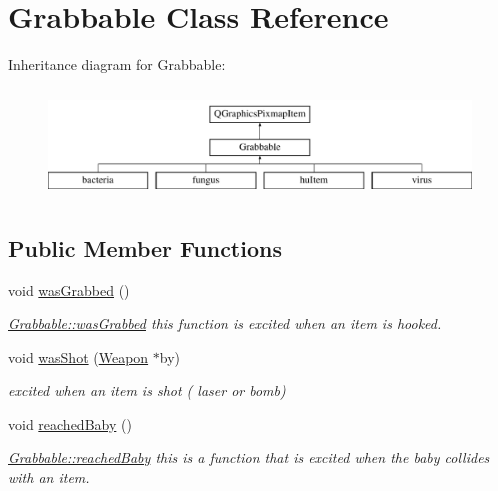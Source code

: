 \hypertarget{classGrabbable}{\section{Grabbable Class Reference}
\label{classGrabbable}
}
Inheritance diagram for Grabbable\-:\begin{figure}[H]
\begin{center}
\leavevmode
\includegraphics[height=2.937063cm]{classGrabbable}
\end{center}
\end{figure}
\subsection*{Public Member Functions}
\begin{DoxyCompactItemize}
\item 
void \hyperlink{classGrabbable_a54abafe482bfeff9bc4950eb1af86729}{was\-Grabbed} ()
\begin{DoxyCompactList}\small\item\em \hyperlink{classGrabbable_a54abafe482bfeff9bc4950eb1af86729}{Grabbable\-::was\-Grabbed} this function is excited when an item is hooked. \end{DoxyCompactList}\item 
void \hyperlink{classGrabbable_a1dbbee1086ee34f1c32493a7c80e0f04}{was\-Shot} (\hyperlink{classWeapon}{Weapon} $\ast$by)
\begin{DoxyCompactList}\small\item\em excited when an item is shot ( laser or bomb) \end{DoxyCompactList}\item 
void \hyperlink{classGrabbable_ab6352505d07da9d327be2f74faaae141}{reached\-Baby} ()
\begin{DoxyCompactList}\small\item\em \hyperlink{classGrabbable_ab6352505d07da9d327be2f74faaae141}{Grabbable\-::reached\-Baby} this is a function that is excited when the baby collides with an item. \end{DoxyCompactList}\end{DoxyCompactItemize}
